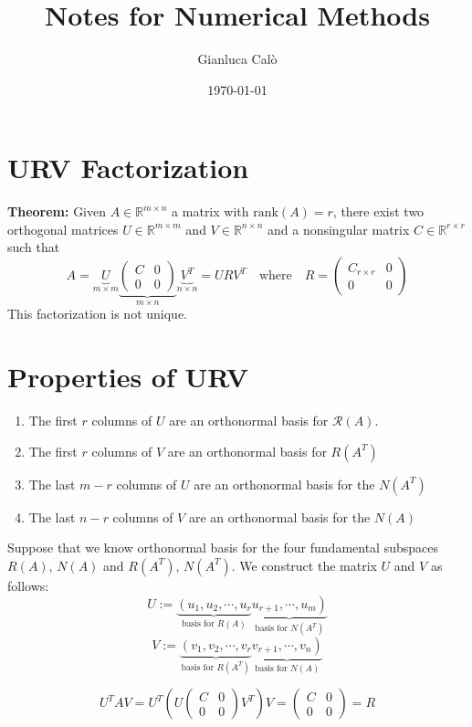 \documentclass[a4paper, 12pt]{article}
\title{Notes for Numerical Methods}
\author{Gianluca Calò}
\date{\today}
\begin{document}
\maketitle

\section{URV Factorization}
\textbf{Theorem:} Given $A \in \mathbb{R}^{m \times n}$ a matrix with $\text{rank}(A)=r$, there exist two orthogonal matrices $U \in \mathbb{R}^{m \times m}$ and $V \in \mathbb{R}^{n \times n}$ and a nonsingular matrix $C \in \mathbb{R}^{r \times r}$ such that
\[
A =
\underbrace{U}_{m \times m}
\underbrace{
    \begin{pmatrix}
    C & 0 \\
    0 & 0
    \end{pmatrix}
}_{m \times n}
\underbrace{V^T}_{n \times n} = URV^T
\quad
\text{where}
\quad
R = \begin{pmatrix}
C_{r \times r} & 0 \\
0 & 0
\end{pmatrix}
\]
This factorization is not unique.

\section{Properties of URV}
\begin{enumerate}
\item The first $r$ columns of $U$ are an orthonormal basis for $\mathcal{R}(A)$.
\item The first $r$ columns of $V$ are an orthonormal basis for $R(A^T)$
\item The last $m-r$ columns of $U$ are an orthonormal basis for the $N(A^T)$
\item The last $n-r$ columns of $V$ are an orthonormal basis for the $N(A)$
\end{enumerate}

Suppose that we know orthonormal basis for the four fundamental subspaces
$R(A)$, $N(A)$ and $R(A^T)$, $N(A^T)$.
We construct the matrix $U$ and $V$ as follows:
$$U := \underbrace{\left(u_1, u_2, \cdots, u_r\right.}_{\text{basis for } R(A)} \underbrace{\left.u_{r+1}, \cdots, u_m\right)}_{\text{basis for } N(A^T)}$$
$$V := \underbrace{\left(v_1, v_2, \cdots, v_r\right.}_{\text{basis for } R(A^T)} \underbrace{\left.v_{r+1}, \cdots, v_n\right)}_{\text{basis for } N(A)}$$

\[
U^T A V = U^T \left( U \begin{pmatrix}
C & 0 \\
0 & 0
\end{pmatrix} V^T \right) V = \begin{pmatrix}
C & 0 \\
0 & 0
\end{pmatrix} = R
\]
\end{document}
